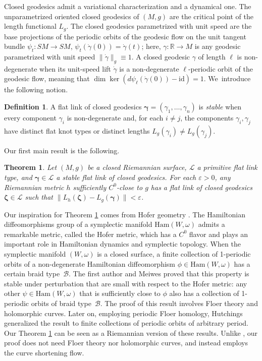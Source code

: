 \documentclass[JEP,XML,SOM,Unicode,NoFloatCountersInSection,published]{cedram}
\let\epsilon\varepsilon
\let\bm\boldsymbol
\newcommand{\R}{\mathbb{R}}
\newcommand{\LL}{\mathcal{L}}
\newcommand{\id}{\mathrm{id}}
\theoremstyle{plain}
\newtheorem{MainThm}{Theorem}
\theoremstyle{definition}
\newtheorem{Definition}[Thm]{Definition}
\begin{document}
Closed geodesics admit a variational characterization and a dynamical one. The unparametrized oriented closed geodesics of $(M,g)$ are the critical point of the length functional $L_g$. The closed geodesics parametrized with unit speed are the base projections of the periodic orbits of the geodesic flow on the unit tangent bundle \hbox{$\psi_t:SM\to SM$}, $\psi_t(\dot\gamma(0))=\dot\gamma(t)$; here, $\gamma:\R\to M$ is any geodesic parametrized with unit speed $\|\dot\gamma\|_g\equiv1$. A closed geodesic $\gamma$ of length $\ell$ is non-degenerate when its unit-speed lift $\dot\gamma$ is a non-degenerate $\ell$-periodic orbit of the geodesic flow, meaning that $\dim\ker(d\psi_\ell(\dot\gamma(0))-\id)=1$. We~introduce the following notion.

\begin{Definition}\label{d:stable_link}
A flat link of closed geodesics $\bm\gamma=(\gamma_1,\dots,\gamma_n)$ is \emph{stable} when every component $\gamma_i$ is non-degenerate and, for each $i\neq j$, the components $\gamma_i,\gamma_j$ have distinct flat knot types or distinct lengths $L_g(\gamma_i)\neq L_g(\gamma_j)$.\end{Definition}

Our first main result is the following.

\begin{MainThm}\label{mt:links}
Let $(M,g)$ be a closed Riemannian surface, $\LL$ a primitive flat link type, and $\bm\gamma\in\LL$ a stable flat link of closed geodesics. For each $\epsilon>0$, any Riemannian metric $h$ sufficiently $C^0$-close to $g$ has a flat link of closed geodesics $\bm\zeta\in\LL$ such that $\|L_h(\bm\zeta)- L_g(\bm\gamma)\|<\epsilon$.
\end{MainThm}

Our inspiration for Theorem \ref{mt:links} comes from Hofer geometry \cite{Hofer:1990aa, Polterovich:2001aa}. The Hamiltonian diffeomorphisms group of a symplectic manifold $\mathrm{Ham}(W,\omega)$ admits a remarkable metric, called the Hofer metric, which has a $C^0$ flavor and plays an important role in Hamiltonian dynamics and symplectic topology. When the symplectic manifold $(W,\omega)$ is a closed surface,
a finite collection of 1-periodic orbits of a non-degenerate Hamiltonian diffeomorphism $\phi\in\mathrm{Ham}(W,\omega)$ has a certain braid type~$\mathcal B$. The first author and Meiwes \cite{Alves:2021aa} proved that this property is stable under perturbation that are small with respect to the Hofer metric: any other $\psi\in\mathrm{Ham}(W,\omega)$ that is sufficiently close to $\phi$ also has a collection of 1-periodic orbits of braid type~$\mathcal B$. The proof of this result involves Floer theory and holomorphic curves. Later on, employing periodic Floer homology, Hutchings \cite{Hutchings:2023aa} generalized the result to finite collections of periodic orbits of arbitrary period.
Our Theorem \ref{mt:links} can be seen as a Riemannian version of these results. Unlike \cite{Alves:2021aa, Hutchings:2023aa}, our proof does not need Floer theory nor holomorphic curves, and instead employs the curve shortening flow.
\end{document}
